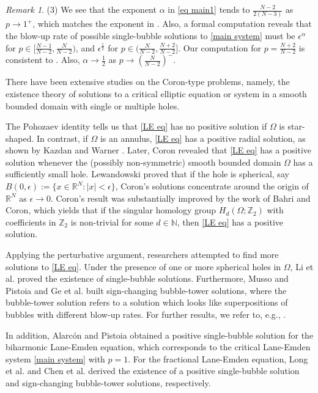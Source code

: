 \documentclass[reqno]{amsart}
\theoremstyle{remark}
\newtheorem{remark}[theorem]{Remark}
\newcommand{\ep}{\epsilon}
\newcommand{\R}{\mathbb{R}}
\renewcommand{\(}{\left(}
\renewcommand{\)}{\right)}
\numberwithin{equation}{section}
\begin{document}
\begin{remark}
\medskip \noindent (3) We see that the exponent $\alpha$ in \eqref{eq main1} tends to $\frac{N-2}{2(N-3)}$ as $p \to 1^+$, which matches the exponent in \cite[(2.3)]{AP}.
Also, a formal computation reveals that the blow-up rate of possible single-bubble solutions to \eqref{main system} must be $\ep^{\alpha}$
for $p \in [\frac{N-1}{N-2},\frac{N}{N-2})$, and $\ep^{\frac{1}{2}}$ for $p \in (\frac{N}{N-2},\frac{N+2}{N-2}]$.
Our computation for $p = \frac{N+2}{N-2}$ is consistent to \cite[Theorem 1.1]{LYY2}. Also, $\alpha \to \frac{1}{2}$ as $p \to (\frac{N}{N-2})^-$.
\end{remark}

There have been extensive studies on the Coron-type problems, namely, the existence theory of solutions to a critical elliptic equation or system in a smooth bounded domain with single or multiple holes.

The Pohozaev identity tells us that \eqref{LE eq} has no positive solution if $\Omega$ is star-shaped.
In contrast, if $\Omega$ is an annulus, \eqref{LE eq} has a positive radial solution, as shown by Kazdan and Warner \cite{KW}.
Later, Coron \cite{Co} revealed that \eqref{LE eq} has a positive solution whenever the (possibly non-symmetric) smooth bounded domain $\Omega$ has a sufficiently small hole.
Lewandowski \cite{Le} proved that if the hole is spherical, say $B(0,\ep) := \{x \in \R^N: |x| < \ep\}$, Coron's solutions concentrate around the origin of $\R^N$ as $\ep \to 0$.
Coron's result was substantially improved by the work \cite{BC} of Bahri and Coron, which yields that
if the singular homology group $H_d(\Omega;\mathbb{Z}_2)$ with coefficients in $\mathbb{Z}_2$ is non-trivial for some $d \in \mathbb{N}$, then \eqref{LE eq} has a positive solution.

Applying the perturbative argument, researchers attempted to find more solutions to \eqref{LE eq}.
Under the presence of one or more spherical holes in $\Omega$, Li et al. \cite{LYY2} proved the existence of single-bubble solutions.
Furthermore, Musso and Pistoia \cite{MP} and Ge et al. \cite{GMP} built sign-changing bubble-tower solutions, where the bubble-tower solution refers to a solution which looks like superpositions of bubbles with different blow-up rates.
For further results, we refer to, e.g., \cite{MP2, CMP, DM}.

In addition, Alarc\'on and Pistoia \cite{AP} obtained a positive single-bubble solution for the biharmonic Lane-Emden equation, which corresponds to the critical Lane-Emden system \eqref{main system} with $p = 1$.
For the fractional Lane-Emden equation, Long et al. \cite{LYY} and Chen et al. \cite{CLY} derived the existence of a positive single-bubble solution and sign-changing bubble-tower solutions, respectively.
\end{document}
